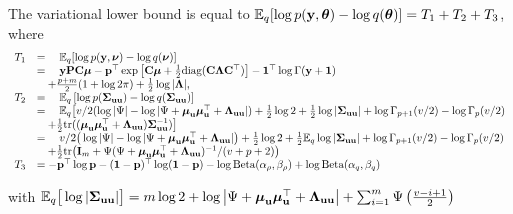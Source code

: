 \documentclass[11pt]{amsart}
\begin{document}
The variational lower bound is equal to ${\mathbb E}_q[\log{p({\bf y}, {\boldsymbol\theta})} - \log{q({\boldsymbol\theta})}] = T_1 + T_2 + T_3$,
where
$$
\begin{array}{rl}
	T_1 & = \quad {\mathbb E}_q[\log{p({\bf y}, {\boldsymbol\nu})} - \log{q({\boldsymbol\nu})}]                                                                                                                                                  \\
	    & = \quad {\bf y} {\bf P} {\bf C} {\boldsymbol\mu} - {\bf p}^\top \exp{\left[ {\bf C}{\boldsymbol\mu}+  \tfrac{1}{2} \text{diag} ({\bf C}{\boldsymbol\Lambda}{\bf C}^\top) \right]} - {\bf 1}^\top\log \Gamma{({\bf y}+ {\bf1})}                                               \\
	    & \quad + \frac{p + m}{2} (1 + \log{2 \pi}) + \tfrac{1}{2} \log{|{\boldsymbol\Lambda}|},                                                                                                                                \\
	T_2 & = \quad {\mathbb E}_q \left[ \log p({\boldsymbol \Sigma}_{{\bf u} {\bf u}}) - \log q({\boldsymbol \Sigma}_{{\bf u} {\bf u}}) \right]                                                                                                                 \\
	    & = \quad {\mathbb E}_q \big[ v/2(\log |\Psi| - \log |\Psi + {\boldsymbol \mu}_{\bf u} {\boldsymbol \mu}_{\bf u}^\top + {\boldsymbol \Lambda}_{{\bf u} {\bf u}}|) + \tfrac{1}{2} \log 2 + \tfrac{1}{2} \log|{\boldsymbol \Sigma}_{{\bf u} {\bf u}}| + \log \Gamma_{p+1}(v/2) - \log \Gamma_{p}(v/2)    \\
	    & \quad + \tfrac{1}{2} \text{tr}(({\boldsymbol \mu}_{{\bf u}} {\boldsymbol \mu}_{{\bf u}}^\top + {\boldsymbol \Lambda}_{{\bf u} {\bf u}}) {\boldsymbol \Sigma}_{{\bf u} {\bf u}}^{-1}) \big]                                                                                                  \\
	    & = \quad v/2\big(\log |\Psi| - \log |\Psi + {\boldsymbol \mu}_{\bf u} {\boldsymbol \mu}_{\bf u}^\top + {\boldsymbol \Lambda}_{{\bf u} {\bf u}}|\big) + \tfrac{1}{2} \log 2 + \tfrac{1}{2} {\mathbb E}_q \log |{\boldsymbol \Sigma}_{{\bf u} {\bf u}}| + \log \Gamma_{p+1}(v/2) - \log \Gamma_{p}(v/2) \\
	    & \quad + \tfrac{1}{2} \text{tr}\big({\bf I}_m + \Psi(\Psi+ {\boldsymbol \mu}_{\bf u} {\boldsymbol \mu}_{\bf u}^\top + {\boldsymbol \Lambda}_{{\bf u} {\bf u}})^{-1}/(v + p + 2)\big)                                                                                        \\
	T_3 & = - {\bf p}^\top \log {\bf p} - ({\bf 1} - {\bf p})^\top \log ({\bf 1} - {\bf p}) - \log \text{Beta} (\alpha_\rho, \beta_\rho) + \log \text{Beta} (\alpha_q, \beta_q)                                                              
\end{array}
$$
	
\noindent with ${\mathbb E}_q \big[ \log |{\boldsymbol \Sigma}_{{\bf u} {\bf u}}| \big] = m \log 2 + \log \left | \Psi + {\boldsymbol \mu}_{\bf u} {\boldsymbol \mu}_{\bf u}^\top + {\boldsymbol \Lambda}_{{\bf u} {\bf u}} \right | + \sum_{i=1}^m \Psi \left ( \frac{v - i + 1}{2} \right )$
\end{document}
